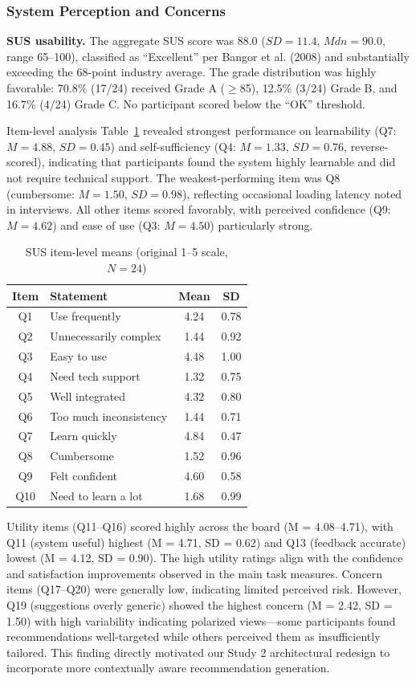 \documentclass[]{llncs}
\begin{document}
\subsubsection{System Perception and Concerns}

\textbf{SUS usability.} The aggregate SUS score was 88.0 ($SD = 11.4$, $Mdn = 90.0$, range 65--100), 
classified as ``Excellent'' per Bangor et al. (2008) and substantially 
exceeding the 68-point industry average. The grade distribution was highly 
favorable: 70.8\% (17/24) received Grade A ($\geq$85), 12.5\% (3/24) Grade B, 
and 16.7\% (4/24) Grade C. No participant scored below the ``OK'' threshold.

Item-level analysis Table~\ref{tab:sus} revealed strongest 
performance on learnability (Q7: $M = 4.88$, $SD = 0.45$) and self-sufficiency 
(Q4: $M = 1.33$, $SD = 0.76$, reverse-scored), indicating that participants 
found the system highly learnable and did not require technical support. 
The weakest-performing item was Q8 (cumbersome: $M = 1.50$, $SD = 0.98$), 
reflecting occasional loading latency noted in interviews. All other items 
scored favorably, with perceived confidence (Q9: $M = 4.62$) and ease of use 
(Q3: $M = 4.50$) particularly strong.

\begin{table}[htbp]
\centering
\caption{SUS item-level means (original 1--5 scale, $N=24$)}
\label{tab:sus}
\begin{tabular}{clcc}
\hline
Item & Statement & Mean & SD \\
\hline
Q1 & Use frequently & 4.24 & 0.78 \\
Q2 & Unnecessarily complex & 1.44 & 0.92 \\
Q3 & Easy to use & 4.48 & 1.00 \\
Q4 & Need tech support & 1.32 & 0.75 \\
Q5 & Well integrated & 4.32 & 0.80 \\
Q6 & Too much inconsistency & 1.44 & 0.71 \\
Q7 & Learn quickly & 4.84 & 0.47 \\
Q8 & Cumbersome & 1.52 & 0.96 \\
Q9 & Felt confident & 4.60 & 0.58 \\
Q10 & Need to learn a lot & 1.68 & 0.99 \\
\hline
\end{tabular}
\end{table}

Utility items (Q11–Q16) scored highly across the board (M = 4.08–4.71), with Q11 (system useful) highest (M = 4.71, SD = 0.62) and Q13 (feedback accurate) lowest (M = 4.12, SD = 0.90). The high utility ratings align with the confidence and satisfaction improvements observed in the main task measures.
Concern items (Q17–Q20) were generally low, indicating limited perceived risk. However, Q19 (suggestions overly generic) showed the highest concern (M = 2.42, SD = 1.50) with high variability indicating polarized views—some participants found recommendations well-targeted while others perceived them as insufficiently tailored. This finding directly motivated our Study 2 architectural redesign to incorporate more contextually aware recommendation generation.
\end{document}
